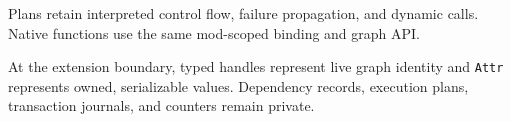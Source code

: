Plans retain interpreted control flow, failure propagation, and dynamic calls.
Native functions use the same mod-scoped binding and graph API.

At the extension boundary, typed handles represent live graph identity and
\texttt{Attr} represents owned, serializable values. Dependency records,
execution plans, transaction journals, and counters remain private.
